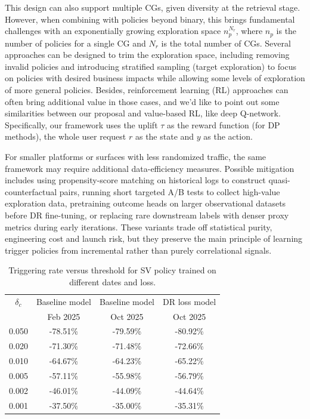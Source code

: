 \documentclass[sigconf, authorversion]{acmart}
\begin{document}
This design can also support multiple CGs, given diversity at the retrieval stage. However, when combining with policies beyond binary, this brings fundamental challenges with an exponentially growing exploration space $n_p^{N_r}$, where $n_p$ is the number of policies for a single CG and $N_r$ is the total number of CGs. Several approaches can be designed to trim the exploration space, including removing invalid policies and introducing stratified sampling (target exploration) to focus on policies with desired business impacts while allowing some levels of exploration of more general policies. Besides, reinforcement learning (RL) approaches can often bring additional value in those cases, and we'd like to point out some similarities between our proposal and value-based RL, like deep Q-network. Specifically, our framework uses the uplift $\tau$ as the reward function (for DP methods), the whole user request $r$ as the state and $y$ as the action. 

For smaller platforms or surfaces with less randomized traffic, the same framework may require additional data-efficiency measures. Possible mitigation includes using propensity-score matching on historical logs to construct quasi-counterfactual pairs, running short targeted A/B tests to collect high-value exploration data, pretraining outcome heads on larger observational datasets before DR fine-tuning, or replacing rare downstream labels with denser proxy metrics during early iterations. These variants trade off statistical purity, engineering cost and launch risk, but they preserve the main principle of learning trigger policies from incremental rather than purely correlational signals.

\begin{table}[h]
  \caption{Triggering rate versus threshold for SV policy trained on different dates and loss.}
  \label{tab:model_stability}
  \begin{tabular}{cccc}
    \toprule
    $\delta_c$ & Baseline model & Baseline model & DR loss model \\
     & Feb 2025 & Oct 2025 & Oct 2025 \\
    \hline
    0.050 & -78.51\% & -79.59\% & -80.92\%  \\
    0.020 & -71.30\% & -71.48\% & -72.66\% \\
    0.010 & -64.67\% & -64.23\% & -65.22\% \\
    0.005 & -57.11\% & -55.98\% & -56.79\%  \\
    0.002 & -46.01\% & -44.09\% & -44.64\% \\
    0.001 & -37.50\% & -35.00\% & -35.31\% \\
    \bottomrule
  \end{tabular}
\end{table}
\end{document}
